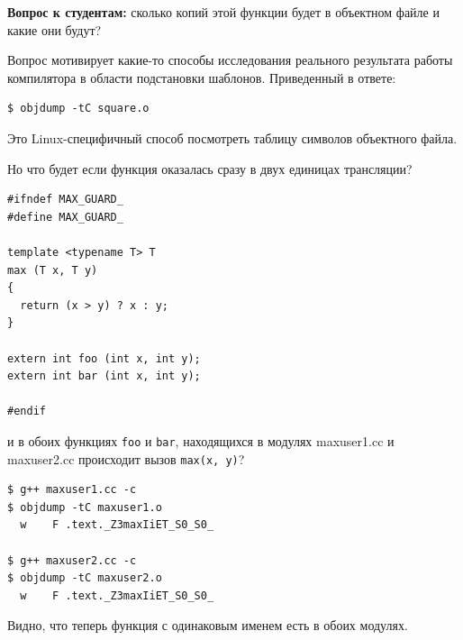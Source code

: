 \documentclass[a4paper,12pt,oneside]{article}
\newif\ifanswers
\begin{document}
\textbf{Вопрос к студентам:} сколько копий этой функции будет в объектном файле и какие они будут?

\ifanswers
В вопросе конечно есть подвох:

\begin{verbatim}
$ g++ -c square.cc
$ objdump -tC square.o
\end{verbatim}

даёт 

\begin{verbatim}
_Z6squareIiET_S0_
_Z6squareIdET_S0_ 
\end{verbatim}

Что соответствует:

\begin{lstlisting}
int square<int>(int);
double square<double>(double);
\end{lstlisting}
\fi

Вопрос мотивирует какие-то способы исследования реального результата работы компилятора в области подстановки шаблонов. Приведенный в ответе:

\begin{verbatim}
$ objdump -tC square.o
\end{verbatim}

Это Linux-специфичный способ посмотреть таблицу символов объектного файла.

Но что будет если функция оказалась сразу в двух единицах трансляции?

\begin{lstlisting}
#ifndef MAX_GUARD_
#define MAX_GUARD_

template <typename T> T
max (T x, T y)
{
  return (x > y) ? x : y;
}

extern int foo (int x, int y);
extern int bar (int x, int y);

#endif
\end{lstlisting}

и в обоих функциях \lstinline!foo! и \lstinline!bar!, находящихся в модулях maxuser1.cc и maxuser2.cc происходит вызов \lstinline!max(x, y)!?

\begin{verbatim}
$ g++ maxuser1.cc -c
$ objdump -tC maxuser1.o
  w    F .text._Z3maxIiET_S0_S0_

$ g++ maxuser2.cc -c
$ objdump -tC maxuser2.o
  w    F .text._Z3maxIiET_S0_S0_
\end{verbatim}

Видно, что теперь функция с одинаковым именем есть в обоих модулях.
\end{document}
